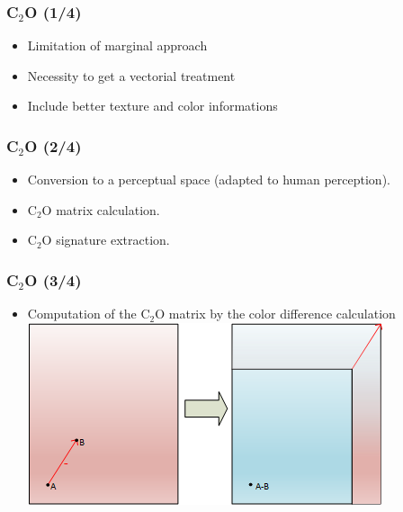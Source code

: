\documentclass[xcolor=table]{beamer}
\begin{document}
\begin{frame} \frametitle{C$_2$O (1/4)}
   \begin{itemize}
        \item Limitation of marginal approach
        \item Necessity to get a vectorial treatment
        \item Include better texture and color informations
    \end{itemize}
\end{frame}


\begin{frame} \frametitle{C$_2$O (2/4)}

\begin{itemize}
    \item Conversion to a perceptual space (adapted to human perception).
    \item C$_2$O matrix calculation.
    \item C$_2$O signature extraction.
\end{itemize}

\end{frame}


\begin{frame} \frametitle{C$_2$O (3/4)}

\begin{itemize}
    \item Computation of the C$_2$O matrix by the color difference calculation
    \includegraphics[scale=1.0]{ColorDiff.png}

\end{itemize}

\end{frame}
\end{document}
